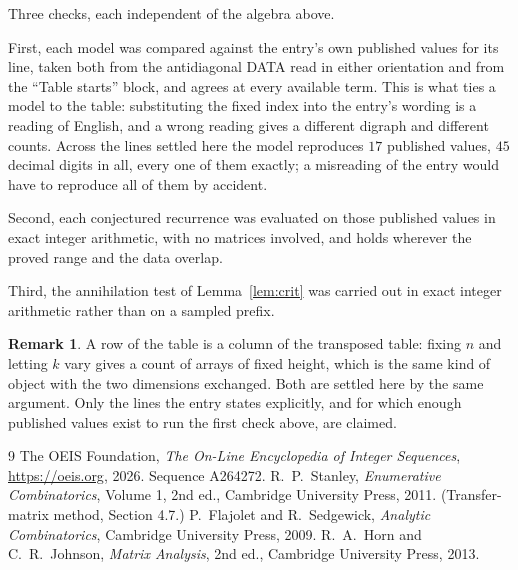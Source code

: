 \documentclass[11pt,a4paper]{article}
\theoremstyle{plain}
\theoremstyle{definition}
\newtheorem{remark}[theorem]{Remark}
\begin{document}
Three checks, each independent of the algebra above.

First, each model was compared against the entry's own published values for its line, taken
both from the antidiagonal DATA read in either orientation and from the ``Table starts''
block, and agrees at every available term. This is what ties a model to the table:
substituting the fixed index into the entry's wording is a reading of English, and a wrong
reading gives a different digraph and different counts. Across the lines settled here the
model reproduces $17$ published values, $45$ decimal digits in all, every one of
them exactly; a misreading of the entry would have to reproduce all of them by accident.

Second, each conjectured recurrence was evaluated on those published values in exact
integer arithmetic, with no matrices involved, and holds wherever the proved range and the
data overlap.

Third, the annihilation test of Lemma~\ref{lem:crit} was carried out in exact integer
arithmetic rather than on a sampled prefix.

\begin{remark}
A row of the table is a column of the transposed table: fixing $n$ and letting $k$ vary gives a
count of arrays of fixed height, which is the same kind of object with the two dimensions
exchanged. Both are settled here by the same argument. Only the lines the entry states
explicitly, and for which enough published values exist to run the first check above, are
claimed.
\end{remark}

\begin{thebibliography}{9}
 The OEIS Foundation, \emph{The On-Line Encyclopedia of Integer
Sequences}, \url{https://oeis.org}, 2026. Sequence A264272.
 R.~P.~Stanley, \emph{Enumerative Combinatorics}, Volume 1, 2nd ed.,
Cambridge University Press, 2011. (Transfer-matrix method, Section 4.7.)
 P.~Flajolet and R.~Sedgewick, \emph{Analytic Combinatorics}, Cambridge
University Press, 2009.
 R.~A.~Horn and C.~R.~Johnson, \emph{Matrix Analysis}, 2nd ed., Cambridge
University Press, 2013.
\end{thebibliography}
\end{document}
